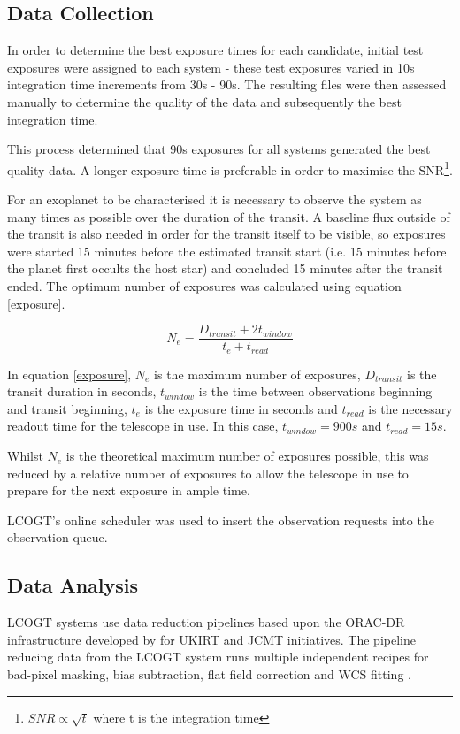 \documentclass[twoside]{article}
\begin{document}
\begin{multicols}{2}
\subsection{Data Collection}
In order to determine the best exposure times for each candidate, initial test exposures
were assigned to each system - these test exposures varied in 10s integration time
increments from 30s - 90s. The resulting files were then assessed manually to determine
the quality of the data and subsequently the best integration time.

This process determined that 90s exposures for all systems generated the best quality
data. A longer exposure time is preferable in order to maximise the SNR\footnote{$SNR 
\propto \sqrt{t}$ where t is the integration time}. 

For an exoplanet to be characterised it is necessary to observe the system as many times as possible over the duration of the transit. A baseline flux outside of the transit is also needed in order for the transit itself to be visible, so exposures were started 15 minutes before the estimated transit start (i.e. 15 minutes before the planet first occults the host star) and concluded 15 minutes after the transit ended. The optimum number of exposures was calculated using equation \ref{exposure}. 

\begin{equation} \label{exposure}
    N_{e} = \frac{D_{transit} + 2t_{window}}{t_{e} + t_{read}}
\end{equation}

In equation \ref{exposure}, $N_{e}$ is the maximum number of exposures, $D_{transit}$ is the transit duration in seconds, $t_{window}$ is the time between observations beginning and transit beginning, $t_{e}$ is the exposure time in seconds and $t_{read}$ is the necessary readout time for the telescope in use. In this case, $t_{window}=900s$ and $t_{read}=15s$.

Whilst $N_{e}$ is the theoretical maximum number of exposures possible, this was reduced by a relative number of exposures to allow the telescope in use to prepare for the next exposure in ample time. 

LCOGT's online scheduler was used to insert the observation requests into the observation queue.

\subsection{Data Analysis}
LCOGT systems use data reduction pipelines based upon the ORAC-DR infrastructure developed by \cite{orac-dr} for UKIRT and JCMT initiatives. The pipeline reducing data from the LCOGT system runs multiple independent recipes for bad-pixel masking, bias subtraction, flat field correction and WCS fitting \citep{pipeline}.  


\end{multicols}
\end{document}
